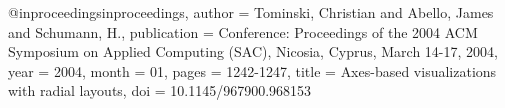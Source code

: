 @inproceedings{inproceedings,
author = {Tominski, Christian and Abello, James and Schumann, H.},
publication = {Conference: Proceedings of the 2004 ACM Symposium on Applied Computing (SAC), Nicosia, Cyprus, March 14-17, 2004},
year = {2004},
month = {01},
pages = {1242-1247},
title = {Axes-based visualizations with radial layouts},
doi = {10.1145/967900.968153}
}